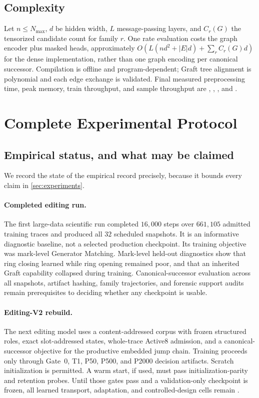 \documentclass{article}
\theoremstyle{definition}
\theoremstyle{remark}
\begin{document}
\subsection{Complexity}

Let $n\le N_{\max}$, $d$ be hidden width, $L$ message-passing layers, and $C_r(G)$ the tensorized candidate count for family $r$. One rate evaluation costs the graph encoder plus masked heads, approximately $O(L(n d^2+|E|d)+\sum_r C_r(G)d)$ for the dense implementation, rather than one graph encoding per canonical successor. Compilation is offline and program-dependent; Graft tree alignment is polynomial and each edge exchange is validated. Final measured preprocessing time, peak memory, train throughput, and sample throughput are \ComposeTrainHours, \ComposePeakMemory, \XXX, and \ComposeThroughput.

\section{Complete Experimental Protocol}\label{app:experiments}

\subsection{Empirical status, and what may be claimed}\label{app:status}

We record the state of the empirical record precisely, because it bounds every claim in \cref{sec:experiments}.

\paragraph{Completed editing run.}
The first large-data scientific run completed $16{,}000$ steps over $661{,}105$ admitted training traces and produced all $32$ scheduled snapshots. It is an informative diagnostic baseline, not a selected production checkpoint. Its training objective was mark-level Generator Matching. Mark-level held-out diagnostics show that ring closing learned while ring opening remained poor, and that an inherited Graft capability collapsed during training. Canonical-successor evaluation across all snapshots, artifact hashing, family trajectories, and forensic support audits remain prerequisites to deciding whether any checkpoint is usable.

\paragraph{Editing-V2 rebuild.}
The next editing model uses a content-addressed corpus with frozen structured roles, exact slot-addressed states, whole-trace Active8 admission, and a canonical-successor objective for the productive embedded jump chain. Training proceeds only through Gate~0, T1, P50, P500, and P2000 decision artifacts. Scratch initialization is permitted. A warm start, if used, must pass initialization-parity and retention probes. Until those gates pass and a validation-only checkpoint is frozen, all learned transport, adaptation, and controlled-design cells remain \XXX{}.
\end{document}
